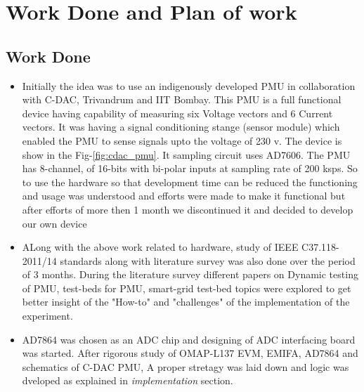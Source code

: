 
\section{Work Done and Plan of work}
\subsection*{Work Done}


\begin{itemize}
\item Initially the idea was to use an indigenously developed PMU in collaboration with C-DAC, Trivandrum and IIT Bombay. This PMU is a full functional device having capability of measuring six Voltage vectors and 6 Current vectors. It was having a signal conditioning stange (sensor module) which enabled the PMU to sense signals upto the voltage of 230 v. The device is show in the Fig-\ref{fig:cdac_pmu}. It sampling circuit uses AD7606. The PMU has 8-channel, of 16-bits with bi-polar inputs at sampling rate of 200 ksps. So to use the hardware so that development time can be reduced the functioning and usage was understood and efforts were made to make it functional but after efforts of more then 1 month we discontinued it and decided to develop our own device

\item ALong with the above work related to hardware, study of IEEE C37.118-2011/14 standards along with literature survey was also done over the period of 3 months. During the literature survey different papers on Dynamic testing of PMU, test-beds for PMU, smart-grid test-bed topics were explored to get better insight of the "How-to" and "challenges" of the implementation of the experiment.

\item AD7864 was chosen as an ADC chip and designing of ADC interfacing board was started. After rigorous study of OMAP-L137 EVM, EMIFA, AD7864 and schematics of C-DAC PMU, A proper stretagy was laid down and logic was dveloped as explained in \textit{implementation} section.   
\end{itemize}

